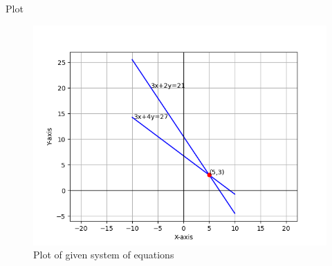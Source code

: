\documentclass{beamer}
\begin{document}
\begin{frame}{Plot}
    \begin{figure}
        \centering
        \includegraphics[width=0.5\columnwidth]{../figs/plot.png}
        \caption{Plot of given system of equations}
        \label{fig:fig}
    \end{figure}
\end{frame}
\end{document}

